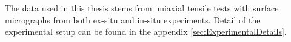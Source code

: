 


The data used in this thesis stems from uniaxial tensile tests with surface micrographs from both ex-situ and in-situ experiments. Detail of the experimental setup can be found in the appendix \ref{sec:ExperimentalDetails}.






